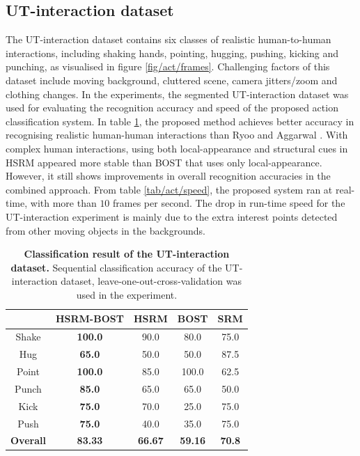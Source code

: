 \subsection{UT-interaction dataset}
The UT-interaction dataset contains six classes of realistic human-to-human interactions, including shaking hands, pointing, hugging, pushing, kicking and punching, as visualised in figure \ref{fig/act/frames}. 
Challenging factors of this dataset include moving background, cluttered scene, camera jitters/zoom and clothing changes. 
In the experiments, the segmented UT-interaction dataset was used for evaluating the recognition accuracy and speed of the proposed action classification system. 
In table \ref{tab/act/utcompare}, the proposed method achieves better accuracy in recognising realistic human-human interactions than Ryoo and Aggarwal \cite{Ryoo2009}. 
With complex human interactions, using both local-appearance and structural cues in HSRM appeared more stable than BOST that uses only local-appearance. 
However, it still shows improvements in overall recognition accuracies in the combined approach. 
From table \ref{tab/act/speed}, the proposed system ran at real-time, with more than $10$ frames per second. 
The drop in run-time speed for the UT-interaction experiment is mainly due to the extra interest points detected from other moving objects in the backgrounds.

\begin{table}
	\centering
	\begin{tabular}{|c|c|c|c|c|}
		\hline 
		\backslashbox{\textbf{Action}}{\textbf{Method}} & \textbf{HSRM-BOST} & \textbf{HSRM} & \textbf{BOST} & \textbf{SRM}\cite{Ryoo2009} \\
		\hline 
		Shake & \textbf{\color{blue}100.0} & 90.0 & 80.0 & 75.0 \\ 
		Hug & \textbf{\color{blue}65.0} & 50.0 & 50.0 & 87.5 \\ 
		Point & \textbf{\color{blue}100.0} & 85.0 & 100.0 & 62.5 \\ 
		Punch & \textbf{\color{blue}85.0} & 65.0 & 65.0 & 50.0 \\ 
		Kick & \textbf{\color{blue}75.0} & 70.0 & 25.0 & 75.0 \\ 
		Push & \textbf{\color{blue}75.0} & 40.0 & 35.0 & 75.0 \\ 
		\hline 	
		\textbf{ Overall } & \textbf{\color{blue}83.33} & \textbf{66.67} & \textbf{59.16} & \textbf{70.8} \\ 
		\hline 
	\end{tabular}
	\caption{\textbf{Classification result of the UT-interaction dataset.} Sequential classification accuracy of the UT-interaction dataset, leave-one-out-cross-validation was used in the experiment.}
	\label{tab/act/utcompare}
\end{table}

